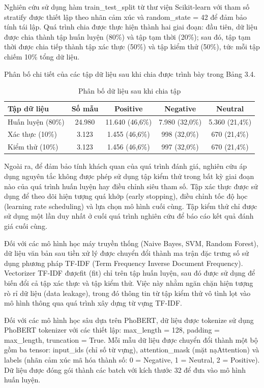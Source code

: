 \documentclass[14pt, a4paper]{report}
\begin{document}
Nghiên cứu sử dụng hàm train\_test\_split từ thư viện Scikit-learn với tham số stratify được thiết lập theo nhãn cảm xúc và random\_state = 42 để đảm bảo tính tái lập. Quá trình chia được thực hiện thành hai giai đoạn: đầu tiên, dữ liệu được chia thành tập huấn luyện (80\%) và tập tạm thời (20\%); sau đó, tập tạm thời được chia tiếp thành tập xác thực (50\%) và tập kiểm thử (50\%), tức mỗi tập chiếm 10\% tổng dữ liệu.


Phân bố chi tiết của các tập dữ liệu sau khi chia được trình bày trong Bảng 3.4.


\begin{table}[h]
\centering
\caption{Phân bố dữ liệu sau khi chia tập}
\begin{tabular}{|l|c|c|c|c|}
\hline
\textbf{Tập dữ liệu} & \textbf{Số mẫu} & \textbf{Positive} & \textbf{Negative} & \textbf{Neutral} \\
\hline
Huấn luyện (80\%) & 24.980 & 11.640 (46,6\%) & 7.980 (32,0\%) & 5.360 (21,4\%) \\
\hline
Xác thực (10\%) & 3.123 & 1.455 (46,6\%) & 998 (32,0\%) & 670 (21,4\%) \\
\hline
Kiểm thử (10\%) & 3.123 & 1.456 (46,6\%) & 997 (32,0\%) & 670 (21,4\%) \\
\hline
\end{tabular}
\end{table}




Ngoài ra, để đảm bảo tính khách quan của quá trình đánh giá, nghiên cứu áp dụng nguyên tắc không được phép sử dụng tập kiểm thử trong bất kỳ giai đoạn nào của quá trình huấn luyện hay điều chỉnh siêu tham số. Tập xác thực được sử dụng để theo dõi hiện tượng quá khớp (early stopping), điều chỉnh tốc độ học (learning rate scheduling) và lựa chọn mô hình cuối cùng. Tập kiểm thử chỉ được sử dụng một lần duy nhất ở cuối quá trình nghiên cứu để báo cáo kết quả đánh giá cuối cùng.


Đối với các mô hình học máy truyền thống (Naive Bayes, SVM, Random Forest), dữ liệu văn bản sau tiền xử lý được chuyển đổi thành ma trận đặc trưng số sử dụng phương pháp TF-IDF (Term Frequency \- Inverse Document Frequency). Vectorizer TF-IDF đượcfit (fit) chỉ trên tập huấn luyện, sau đó được sử dụng để biến đổi cả tập xác thực và tập kiểm thử. Việc này nhằm ngăn chặn hiện tượng rò rỉ dữ liệu (data leakage), trong đó thông tin từ tập kiểm thử vô tình lọt vào mô hình thông qua quá trình xây dựng từ vựng TF-IDF.


Đối với các mô hình học sâu dựa trên PhoBERT, dữ liệu được tokenize sử dụng PhoBERT tokenizer với các thiết lập: max\_length = 128, padding = max\_length, truncation = True. Mỗi mẫu dữ liệu được chuyển đổi thành một bộ gồm ba tensor: input\_ids (chỉ số từ vựng), attention\_mask (mặt nạAttention) và labels (nhãn cảm xúc mã hóa thành số: 0 = Negative, 1 = Neutral, 2 = Positive). Dữ liệu được đóng gói thành các batch với kích thước 32 để đưa vào mô hình huấn luyện.
\end{document}
